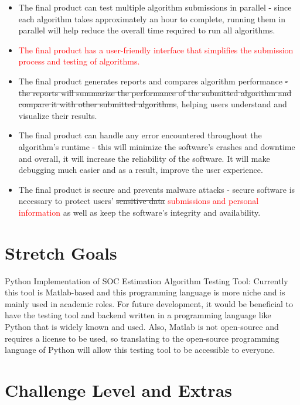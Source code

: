 \documentclass{article}
\begin{document}
\begin{itemize}
    \item The final product can test multiple algorithm submissions in parallel - since each algorithm takes approximately an hour to complete, running them in parallel will help reduce the overall time required to run all algorithms.
    \item \textcolor{red}{The final product has a user-friendly interface that simplifies the submission process and testing of algorithms.}
    \item The final product generates reports and compares algorithm performance \sout{- the reports will summarize the performance of the submitted algorithm and compare it with other submitted algorithms}, helping users understand and visualize their results.
    \item The final product can handle any error encountered throughout the algorithm’s runtime - this will minimize the software’s crashes and downtime and overall, it will increase the reliability of the software. It will make debugging much easier and as a result, improve the user experience.
    \item The final product is secure and prevents malware attacks - secure software is necessary to protect users’ \sout{sensitive data} \textcolor{red}{submissions and personal information} as well as keep the software’s integrity and availability.
\end{itemize}

\section{Stretch Goals}

Python Implementation of SOC Estimation Algorithm Testing Tool: Currently this tool is Matlab-based and this programming language is more niche and is mainly used in academic roles. For future development, it would be beneficial to have the testing tool and backend written in a programming language like Python that is widely known and used. Also, Matlab is not open-source and requires a license to be used, so translating to the open-source programming language of Python will allow this testing tool to be accessible to everyone.  

\section{Challenge Level and Extras}
\end{document}
